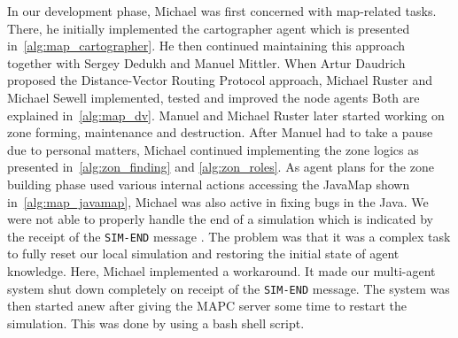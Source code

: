 In our development phase, Michael was first concerned with map-related tasks.
There, he initially implemented the cartographer agent which is presented in~\autoref{alg:map_cartographer}. %
He then continued maintaining this approach together with Sergey Dedukh and Manuel Mittler.
When Artur Daudrich proposed the Distance-Vector Routing Protocol approach, Michael Ruster and Michael Sewell implemented, tested and improved the node agents
Both are explained in~\autoref{alg:map_dv}. %
Manuel and Michael Ruster later started working on zone forming, maintenance and destruction. %
After Manuel had to take a pause due to personal matters, Michael continued implementing the zone logics as presented in~\autoref{alg:zon_finding} and \autoref{alg:zon_roles}.
As agent plans for the zone building phase used various internal actions accessing the JavaMap shown in~\ref{alg:map_javamap}, Michael was also active in fixing bugs in the Java.
We were not able to properly handle the end of a simulation which is indicated by the receipt of the \texttt{SIM-END} message \cite{ahlbrecht_protocol_2014}.
The problem was that it was a complex task to fully reset our local simulation and restoring the initial state of agent knowledge.
Here, Michael implemented a workaround.
It made our multi-agent system shut down completely on receipt of the \texttt{SIM-END} message.
The system was then started anew after giving the MAPC server some time to restart the simulation.
This was done by using a bash shell script.
